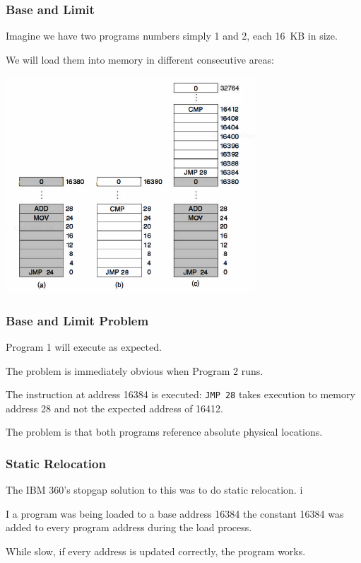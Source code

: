 \begin{frame}
\frametitle{Base and Limit}

Imagine we have two programs numbers simply 1 and 2, each 16~KB in size.

We will load them into memory in different consecutive areas:

\begin{center}
\includegraphics[width=0.70\textwidth]{images/os360.png}
\end{center}


\end{frame}

\begin{frame}
\frametitle{Base and Limit Problem}

Program 1 will execute as expected. 

The problem is immediately obvious when Program 2 runs. 

The instruction at address 16384 is executed: \texttt{JMP 28} takes execution to memory address 28 and not the expected address of 16412. 

The problem is that both programs reference absolute physical locations. 

\end{frame}

\begin{frame}
\frametitle{Static Relocation}

The IBM 360's stopgap solution to this was to do static relocation. i

I a program was being loaded to a base address 16384 the constant 16384 was added to every program address during the load process. 

While slow, if every address is updated correctly, the program works.



\end{frame}

